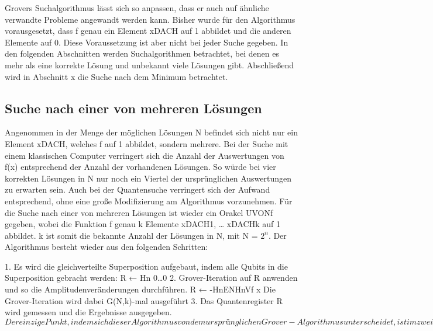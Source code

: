 Grovers Suchalgorithmus lässt sich so anpassen, dass er auch auf ähnliche verwandte Probleme angewandt werden kann. Bisher wurde für den Algorithmus vorausgesetzt, dass f genau ein Element xDACH auf 1 abbildet und die anderen Elemente auf 0. Diese Voraussetzung ist aber nicht bei jeder Suche gegeben. In den folgenden Abschnitten werden Suchalgorithmen betrachtet, bei denen es mehr als eine korrekte Lösung und unbekannt viele Lösungen gibt. Abschließend wird in Abschnitt x die Suche nach dem Minimum betrachtet. 

\subsection{Suche nach einer von mehreren Lösungen}

Angenommen in der Menge der möglichen Lösungen N befindet sich nicht nur ein Element xDACH, welches f auf 1 abbildet, sondern mehrere. Bei der Suche mit einem klassischen Computer verringert sich die Anzahl der Auswertungen von f(x) entsprechend der Anzahl der vorhandenen Lösungen. So würde bei vier korrekten Lösungen in N nur noch ein Viertel der ursprünglichen Auswertungen zu erwarten sein.
Auch bei der Quantensuche verringert sich der Aufwand entsprechend, ohne eine große Modifizierung am Algorithmus vorzunehmen.
Für die Suche nach einer von mehreren Lösungen ist wieder ein Orakel UVONf gegeben, wobei die Funktion f genau k Elemente xDACH1, … xDACHk auf 1 abbildet. k ist somit die bekannte Anzahl der Lösungen in N, mit N = $2^n$. Der Algorithmus besteht wieder aus den folgenden Schritten:

1. Es wird die gleichverteilte Superposition aufgebaut, indem alle Qubits in die Superposition gebracht werden:
R ← Hn 0…0  
2. Grover-Iteration auf R anwenden und so die Amplitudenveränderungen durchführen. 
R ← -HnENHnVf x
Die Grover-Iteration wird dabei G(N,k)-mal ausgeführt
3. Das Quantenregister R wird gemessen und die Ergebnisse ausgegeben.
$ Der einzige Punkt, in dem sich dieser Algorithmus von dem ursprünglichen Grover-Algorithmus unterscheidet, ist im zweiten Schritt die Anzahl der Grover-Iteration. Im Regelfall wird die Grover-Iteration T= pi/4 x sqrt(N) durchgeführt. GN,k) ist jedoch definiert mit:
G(N,k) \tilde{=} pi/4 sqrt(N/k)
Damit reduziert die Anzahl der vorhandenen Lösungen in N die Anzahl der benötigten Grover-Iterationen. Für den Fall, dass k >= 3/4 N kann ein zufälliges Element x aus N gewählt und f(x) ausgewertet werden. Mit einer 75 prozentigen Wahrscheinlichkeit wird f(x) zu 1 auswerten.
Laufzeit$
